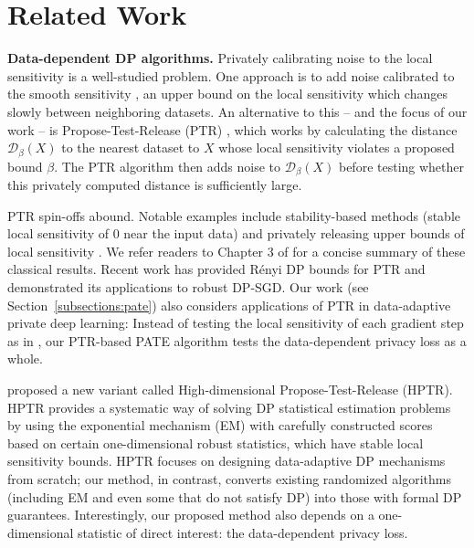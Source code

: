 \section{Related Work}
\label{sec:related_work}

\textbf{Data-dependent DP algorithms.}
Privately calibrating noise to the local sensitivity is a well-studied problem. One approach is to add noise calibrated to the smooth sensitivity \citep{nissim2007smooth}, an upper bound on the local sensitivity which changes slowly between neighboring datasets. %
An alternative to this -- and the focus of our work -- is  Propose-Test-Release (PTR) \citep{dwork2009differential}, which works by calculating the distance $\mathcal{D}_{\beta}(X)$ to the nearest dataset to $X$ whose local sensitivity violates a proposed bound $\beta$. The PTR algorithm then adds noise to $\mathcal{D}_{\beta}(X)$ before testing whether this privately computed distance is sufficiently large.

PTR spin-offs abound. Notable examples include stability-based methods \citep{thakurta2013differentially} (stable local sensitivity of $0$ near the input data) and privately releasing upper bounds of local sensitivity \citep{kasiviswanathan2013analyzing,liu2021differential, decarolis2020end}. We refer readers to Chapter 3 of \citet{vadhan2017complexity} for a concise summary of these classical results. 
Recent work
\citep{wang2022renyi} has provided R\'enyi DP bounds for PTR and demonstrated its applications to robust DP-SGD. Our work (see Section~\ref{subsections:pate}) also considers applications of PTR in data-adaptive private deep learning: Instead of testing the local sensitivity of each gradient step as in \citet{wang2022renyi}, our PTR-based PATE algorithm tests the data-dependent privacy loss as a whole.

\citet{liu2021differential} proposed a new variant called High-dimensional Propose-Test-Release (HPTR). HPTR provides a systematic way of solving DP statistical estimation problems by using the exponential mechanism (EM) with carefully constructed scores based on certain one-dimensional robust statistics, which have stable local sensitivity bounds. HPTR focuses on designing data-adaptive DP mechanisms from scratch; our method, in contrast, converts existing randomized algorithms (including EM and even some that do not satisfy DP) into those with formal DP guarantees. Interestingly, our proposed method also depends on a one-dimensional statistic of direct interest: the data-dependent privacy loss.

